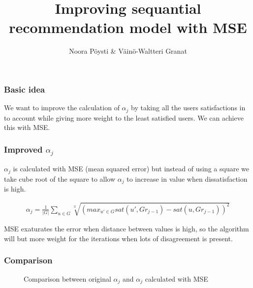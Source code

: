 \documentclass{beamer}
\title{Improving sequantial recommendation model with MSE}
\author{Noora Pöysti \& Väinö-Waltteri Granat}
\begin{document}
\frame{\titlepage}


\begin{frame}
    \frametitle{Basic idea}
    We want to improve the calculation of $\alpha_{j}$ by taking all the users satisfactions in to account while
    giving more weight to the least satisfied users. We can achieve this with MSE.
\end{frame}

\begin{frame}
    \frametitle{Improved $\alpha_j$}

    $\alpha_j$ is calculated with MSE (mean squared error) but instead of using a square we take cube root of the square
    to allow $\alpha_j$ to increase in value when dissatisfaction is high.

    \begin{align*}
    \alpha_j = \frac{1}{|G|} \sum_{u\in G} \sqrt[3]{(max_{u'\in G} sat(u',Gr_{j-1}) - sat(u, Gr_{j-1}))^2}
    \end{align*}

    MSE exaturates the error when distance between values is high, so the algorithm will but more weight for the iterations 
    when lots of disagreement is present.
\end{frame}

\begin{frame}
    \frametitle{Comparison}
    \begin{figure}%
        \centering
        \qquad
        \caption{Comparison between original $\alpha_j$ and $\alpha_j$ calculated with MSE}%
        \label{fig:example}%
    \end{figure}
\end{frame}
\end{document}
